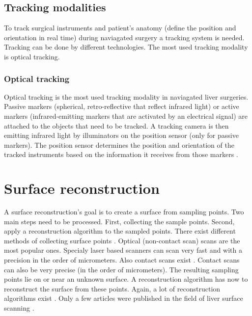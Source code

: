 \subsection{Tracking modalities}
To track surgical instruments and patient's anatomy (define the position and
orientation in real time) during naviagated surgery a tracking system is needed.
Tracking can be done by different technologies. The most used tracking
modality is optical tracking. 

\subsubsection{Optical tracking}
Optical tracking is the most used tracking modality in naviagated liver
surgeries. Passive markers (spherical, retro-reflective that reflect infrared
light) or active markers (infrared-emitting markers that are activated by an
electrical signal) \cite{wiles2004accuracy} are attached to the objects that
need to be tracked. A tracking camera is then emitting infrared light by illuminators
on the position sensor (only for passive markers). The position sensor
determines the position and orientation of the tracked instruments based on the
information it receives from those markers \cite{noauthor_polaris_nodate}.  

\section{Surface reconstruction}
A surface reconstruction's goal is to create a surface from sampling points. Two
main steps need to be processed. First, collecting the sample points. Second,
apply a reconstruction algorithm to the sampled points. There exist different
methods of collecting surface points
\cite{franca20053d}\cite{levoy2000digital}\cite{cui20113d}\cite{chu2002infrared}\cite{dou20153d}.
Optical (non-contact scan) scans are the most popular ones. Specialy laser based
scanners can scan very fast and with a precision in the order of micrometers. Also contact scans exist
\cite{pai2001scanning}. Contact scans can also be very precise (in the order of
micrometers).
The resulting sampling points lie on or near an unknown surface. A
reconstruction algorithm has now to reconstruct the surface from these points.
Again, a lot of reconstruction algorithms exist \cite{lim2014surface}. Only a
few articles were published in the
field of liver surface scanning \cite{maier2014comparative} \cite{thompson2015accuracy}. 





\endinput
